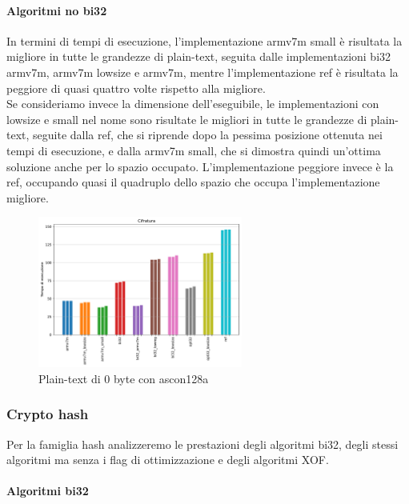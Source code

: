 \documentclass[12pt,a4paper,italian]{report}
\begin{document}
\paragraph{Algoritmi no bi32}

In termini di tempi di esecuzione, l'implementazione armv7m small è risultata la migliore in tutte le grandezze di plain-text, seguita dalle implementazioni bi32 armv7m, armv7m lowsize e armv7m, mentre l'implementazione ref è risultata la peggiore di quasi quattro volte rispetto alla migliore. \\

\noindent Se consideriamo invece la dimensione dell'eseguibile, le implementazioni con lowsize e small nel nome sono risultate le migliori in tutte le grandezze di plain-text, seguite dalla ref, che si riprende dopo la pessima posizione ottenuta nei tempi di esecuzione, e dalla armv7m small, che si dimostra quindi un'ottima soluzione anche per lo spazio occupato. L'implementazione peggiore invece è la ref, occupando quasi il quadruplo dello spazio che occupa l'implementazione migliore.

\begin{figure}[H]
    \centering
    \includegraphics[width=0.6\textwidth]{arduino/ascon128a.pdf}
    \caption{Plain-text di 0 byte con ascon128a}
\end{figure}

\subsubsection{Crypto hash}

Per la famiglia hash analizzeremo le prestazioni degli algoritmi bi32, degli stessi algoritmi ma senza i flag di ottimizzazione e degli algoritmi XOF.

\paragraph{Algoritmi bi32}
\end{document}

